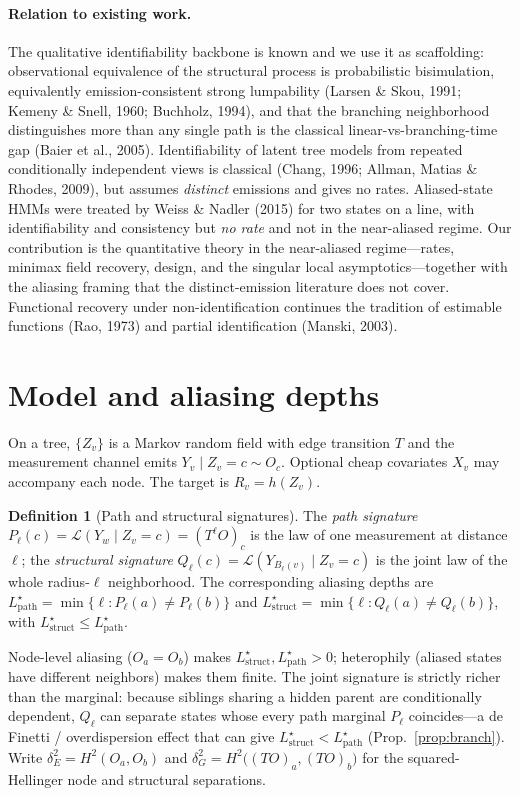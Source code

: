 \documentclass[11pt]{article}
\theoremstyle{plain}
\theoremstyle{definition}\newtheorem{definition}{Definition}\newtheorem{assumption}{Assumption}
\newcommand{\Lpath}{L^\star_{\mathrm{path}}}\newcommand{\Lstr}{L^\star_{\mathrm{struct}}}
\begin{document}
\paragraph{Relation to existing work.} The qualitative identifiability backbone is known and we use it as
scaffolding: observational equivalence of the structural process is probabilistic bisimulation, equivalently
emission-consistent strong lumpability (Larsen \& Skou, 1991; Kemeny \& Snell, 1960; Buchholz, 1994), and that the
branching neighborhood distinguishes more than any single path is the classical linear-vs-branching-time gap
(Baier et al., 2005). Identifiability of latent tree models from repeated conditionally independent views is
classical (Chang, 1996; Allman, Matias \& Rhodes, 2009), but assumes \emph{distinct} emissions and gives no rates.
Aliased-state HMMs were treated by Weiss \& Nadler (2015) for two states on a line, with identifiability and
consistency but \emph{no rate} and not in the near-aliased regime. Our contribution is the quantitative theory
in the near-aliased regime---rates, minimax field recovery, design, and the singular local asymptotics---together
with the aliasing framing that the distinct-emission literature does not cover. Functional recovery under
non-identification continues the tradition of estimable functions (Rao, 1973) and partial identification (Manski,
2003).

\section{Model and aliasing depths}\label{sec:model}
On a tree, $\{Z_v\}$ is a Markov random field with edge transition $T$ and the measurement channel emits
$Y_v\mid Z_v=c\sim O_c$. Optional cheap covariates $X_v$ may accompany each node. The target is $R_v=h(Z_v)$.
\begin{definition}[Path and structural signatures]
The \emph{path signature} $P_\ell(c)=\mathcal L(Y_w\mid Z_v=c)=(T^\ell O)_c$ is the law of one measurement at
distance $\ell$; the \emph{structural signature} $Q_\ell(c)=\mathcal L(Y_{B_\ell(v)}\mid Z_v=c)$ is the joint law
of the whole radius-$\ell$ neighborhood. The corresponding aliasing depths are
$\Lpath=\min\{\ell:P_\ell(a)\neq P_\ell(b)\}$ and $\Lstr=\min\{\ell:Q_\ell(a)\neq Q_\ell(b)\}$, with
$\Lstr\le\Lpath$.
\end{definition}
Node-level aliasing ($O_a=O_b$) makes $\Lstr,\Lpath>0$; heterophily (aliased states have different neighbors) makes
them finite. The joint signature is strictly richer than the marginal: because siblings sharing a hidden parent are
conditionally dependent, $Q_\ell$ can separate states whose every path marginal $P_\ell$ coincides---a de Finetti /
overdispersion effect that can give $\Lstr<\Lpath$ (Prop.~\ref{prop:branch}). Write $\delta_E^2=H^2(O_a,O_b)$ and
$\delta_G^2=H^2\big((TO)_a,(TO)_b\big)$ for the squared-Hellinger node and structural separations.
\end{document}
